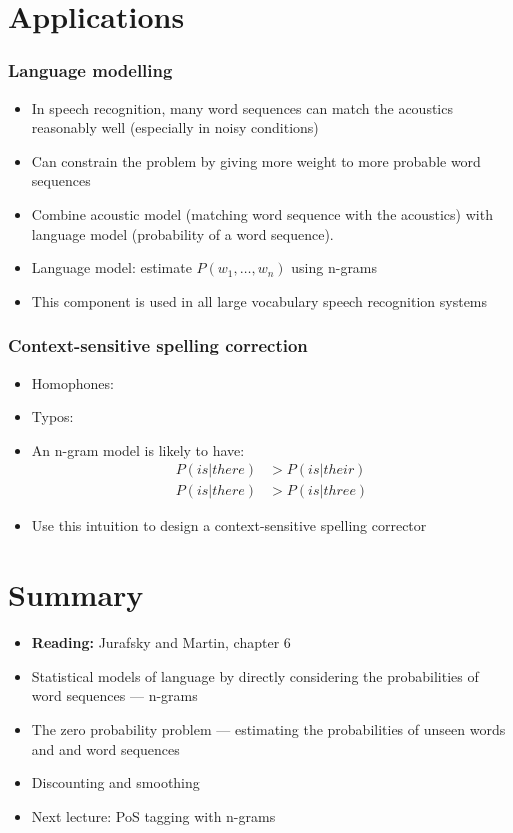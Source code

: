 \section{Applications}

\begin{frame}
  \frametitle{Language modelling}
  \begin{itemize}
  \item In speech recognition, many word sequences can match the
    acoustics reasonably well (especially in noisy conditions)
  \item Can constrain the problem by giving more weight to more
    probable word sequences
  \item Combine acoustic model (matching word sequence with the
    acoustics) with \alert{language model} (probability of a word
    sequence).
  \item Language model: estimate $P(w_1, \dots, w_n)$ using n-grams
  \item This component is used in all large vocabulary speech recognition
    systems 
  \end{itemize}
\end{frame}

\begin{frame}
  \frametitle{Context-sensitive spelling correction}
  \begin{itemize}
  \item Homophones: 
  \item Typos: 
  \item An n-gram model is likely to have:
    \begin{align*}
      P(is|there) &> P(is|their) \\
      P(is|there) &> P(is|three) 
    \end{align*}
  \item Use this intuition to design a context-sensitive spelling
    corrector 
  \end{itemize}
\end{frame}

\section{Summary}

\begin{frame}
  \begin{itemize}
    \item \textbf{Reading:} Jurafsky and Martin, chapter 6
  \item Statistical models of language by directly considering the
    probabilities of word sequences --- n-grams
  \item The zero probability problem --- estimating the probabilities
    of unseen words and and word sequences
  \item Discounting and smoothing
  \item Next lecture: PoS tagging with n-grams
  \end{itemize}
\end{frame}



